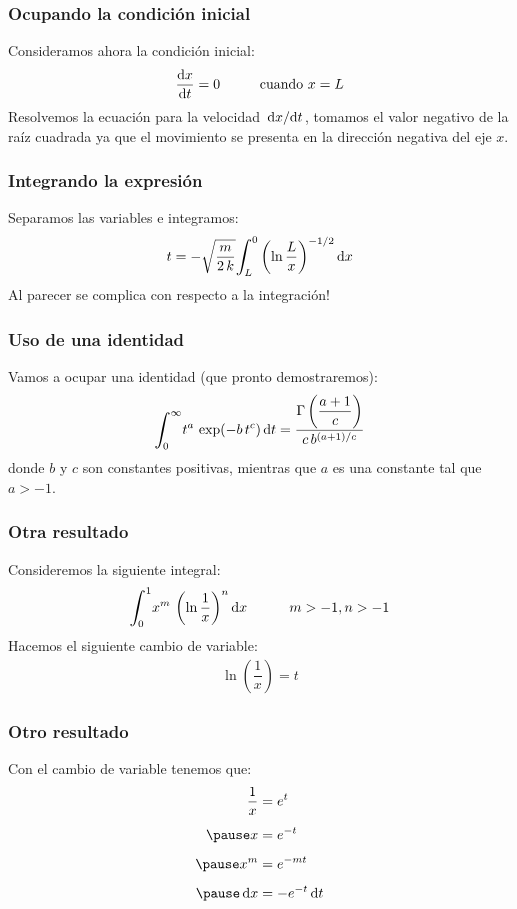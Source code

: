 \documentclass[12pt]{beamer}
\begin{document}
\begin{frame}
\frametitle{Ocupando la condición inicial}
Consideramos ahora la condición inicial:
\pause
\begin{align*}
\dv{x}{t} = 0 \hspace{1cm} \mbox{cuando } x = L
\end{align*}
\pause
Resolvemos la ecuación para la velocidad $\dv*{x}{t}$, tomamos el valor negativo de la raíz cuadrada ya que el movimiento se presenta en la dirección negativa del eje $x$.
\end{frame}
\begin{frame}
\frametitle{Integrando la expresión}
Separamos las variables e integramos:
\pause
\begin{align*}
t = - \sqrt{\dfrac{m}{2 \, k}} \scaleint{6ex}_{\bs L}^{0} \left( \ln \dfrac{L}{x} \right)^{-1/2} \dd{x}
\end{align*}
\pause
Al parecer se complica con respecto a la integración!
\end{frame}
\begin{frame}
\frametitle{Uso de una identidad}
Vamos a ocupar una identidad (que pronto demostraremos):
\begin{align}
\scaleint{6ex}_{\bs 0}^{\infty} t^{a} \, \exp(-b \, t^{c}) \dd{t} = \dfrac{\Gamma \left( \dfrac{a + 1}{c} \right)}{c \, b^{(a+1)/c}}
\label{eq:identidad_Gamma}
\end{align}
donde $b$ y $c$ son constantes positivas, mientras que $a$ es una constante tal que $a > - 1$.
\end{frame}
\begin{frame}
\frametitle{Otra resultado}
Consideremos la siguiente integral:
\pause
\begin{align*}
\scaleint{6ex}_{\bs 0}^{1} x^{m} \, \left( \ln \dfrac{1}{x} \right)^{n} \dd{x} \hspace{1cm} m > -1, n > -1
\end{align*}
\pause
Hacemos el siguiente cambio de variable:
\begin{align*}
\ln \left(\dfrac{1}{x} \right) = t
\end{align*}
\end{frame}
\begin{frame}
\frametitle{Otro resultado}
Con el cambio de variable tenemos que:
\begin{eqnarray*}
\begin{aligned}
\dfrac{1}{x} &= e^{t} \\[0.5em] \pause
x &= e^{-t} \\[0.5em] \pause
x^{m} &= e^{-m t} \\[0.5em] \pause
\dd{x} &= - e^{-t} \dd{t}
\end{aligned}
\end{eqnarray*}
\end{frame}
\end{document}
